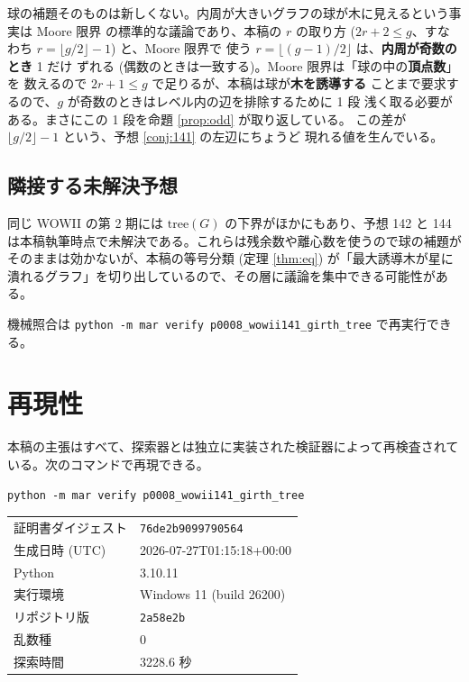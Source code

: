 \documentclass[paper=a4,fontsize=10.5pt,jafontsize=10.5pt]{jlreq}
\theoremstyle{plain}
\theoremstyle{definition}
\begin{document}
球の補題そのものは新しくない。内周が大きいグラフの球が木に見えるという事実は
Moore 限界 \cite{moore} の標準的な議論であり、本稿の $r$ の取り方
($2r + 2 \le g$、すなわち $r = \lfloor g/2 \rfloor - 1$) と、Moore 限界で
使う $r = \lfloor (g-1)/2 \rfloor$ は、\textbf{内周が奇数のとき} 1 だけ
ずれる (偶数のときは一致する)。Moore 限界は「球の中の\textbf{頂点数}」を
数えるので $2r + 1 \le g$ で足りるが、本稿は球が\textbf{木を誘導する}
ことまで要求するので、$g$ が奇数のときはレベル内の辺を排除するために 1 段
浅く取る必要がある。まさにこの 1 段を命題 \ref{prop:odd} が取り返している。
この差が
$\lfloor g/2 \rfloor - 1$ という、予想 \ref{conj:141} の左辺にちょうど
現れる値を生んでいる。

\subsection*{隣接する未解決予想}

同じ WOWII の第 2 期には $\mathrm{tree}(G)$ の下界がほかにもあり、予想 142 と
144 は本稿執筆時点で未解決である。これらは残余数や離心数を使うので球の補題が
そのままは効かないが、本稿の等号分類 (定理 \ref{thm:eq}) が「最大誘導木が星に
潰れるグラフ」を切り出しているので、その層に議論を集中できる可能性がある。

\medskip
\noindent
機械照合は \texttt{python -m mar verify p0008\_wowii141\_girth\_tree} で再実行できる。


\section*{再現性}
本稿の主張はすべて、探索器とは独立に実装された検証器によって再検査されている。次のコマンドで再現できる。

\begin{center}\texttt{python -m mar verify p0008\_wowii141\_girth\_tree}\end{center}

\begin{center}\begin{tabular}{ll}\toprule
証明書ダイジェスト & \texttt{76de2b9099790564} \\
生成日時 (UTC) & 2026-07-27T01:15:18+00:00 \\
Python & 3.10.11 \\
実行環境 & Windows 11 (build 26200) \\
リポジトリ版 & \texttt{2a58e2b} \\
乱数種 & 0 \\
探索時間 & 3228.6 秒 \\
\bottomrule\end{tabular}\end{center}
\end{document}
